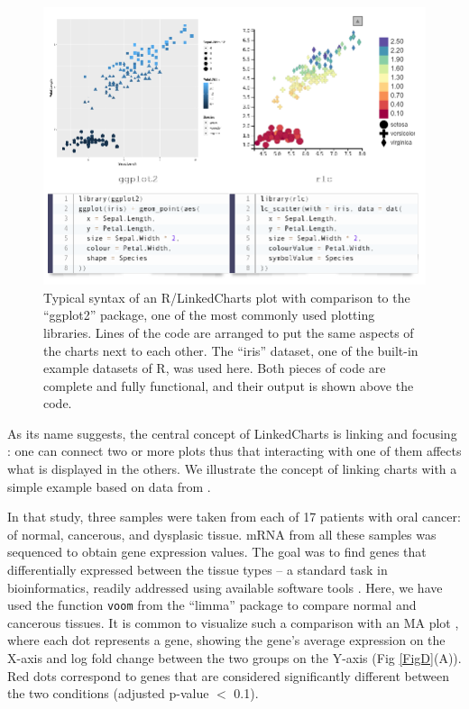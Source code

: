 \documentclass[twocolumn,10pt]{article}
\begin{document}
\begin{figure}[t]
	\includegraphics[width=\textwidth]{FigB/figB.png}
	\caption{Typical syntax of an R/LinkedCharts plot with comparison to the ``ggplot2'' \citep{wickham_2016} package, one of the most commonly used plotting libraries. Lines of the code are arranged to put the same aspects of the charts next to each other. The ``iris'' dataset, one of the built-in example datasets of R, was used here. Both pieces of code are complete and fully functional, and their output is shown above the code.}
	\label{FigB}
\end{figure}

As its name suggests, the central concept of LinkedCharts is linking and focusing \citep{buja_1991}: one can connect two or more plots thus that interacting with one of them affects what is displayed in the others. We illustrate the concept of linking charts with a simple example based on data from \citet{conway_2015}.

In that study, three samples were taken from each of 17 patients with oral cancer: of normal, cancerous, and dysplasic tissue. mRNA from all these samples was sequenced to obtain gene expression values. The goal was to find genes that differentially expressed between the tissue types -- a standard task in bioinformatics, readily addressed using available software tools \citep{ritchie_2015, love_2014}. Here, we have used the function \texttt{voom} from the ``limma'' package \citep{law_2014} to compare normal and cancerous tissues. It is common to visualize such a comparison with an MA plot \citep{dudoit_2002}, where each dot represents a gene, showing the gene's average expression on the X-axis and log fold change between the two groups on the Y-axis (Fig \ref{FigD}(A)). Red dots correspond to genes that are considered significantly different between the two conditions (adjusted p-value $<$ 0.1). 
\end{document}
